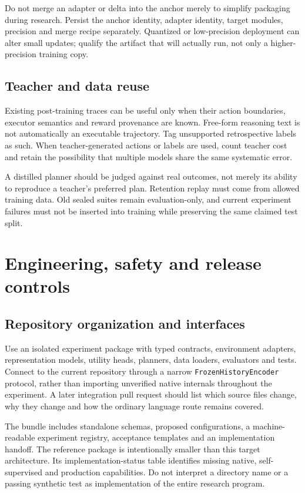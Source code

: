 \documentclass[
  11pt,
  a4paper,
]{article}
\begin{document}
Do not merge an adapter or delta into the anchor merely to simplify
packaging during research. Persist the anchor identity, adapter
identity, target modules, precision and merge recipe separately.
Quantized or low-precision deployment can alter small updates; qualify
the artifact that will actually run, not only a higher-precision
training copy.

\subsection{Teacher and data reuse}\label{teacher-and-data-reuse}

Existing post-training traces can be useful only when their action
boundaries, executor semantics and reward provenance are known.
Free-form reasoning text is not automatically an executable trajectory.
Tag unsupported retrospective labels as such. When teacher-generated
actions or labels are used, count teacher cost and retain the
possibility that multiple models share the same systematic error.

A distilled planner should be judged against real outcomes, not merely
its ability to reproduce a teacher's preferred plan. Retention replay
must come from allowed training data. Old sealed suites remain
evaluation-only, and current experiment failures must not be inserted
into training while preserving the same claimed test split.

\section{Engineering, safety and release
controls}\label{engineering-safety-and-release-controls}

\subsection{Repository organization and
interfaces}\label{repository-organization-and-interfaces}

Use an isolated experiment package with typed contracts, environment
adapters, representation models, utility heads, planners, data loaders,
evaluators and tests. Connect to the current repository through a narrow
\texttt{FrozenHistoryEncoder} protocol, rather than importing unverified
native internals throughout the experiment. A later integration pull
request should list which source files change, why they change and how
the ordinary language route remains covered.

The bundle includes standalone schemas, proposed configurations, a
machine-readable experiment registry, acceptance templates and an
implementation handoff. The reference package is intentionally smaller
than this target architecture. Its implementation-status table
identifies missing native, self-supervised and production capabilities.
Do not interpret a directory name or a passing synthetic test as
implementation of the entire research program.
\end{document}
